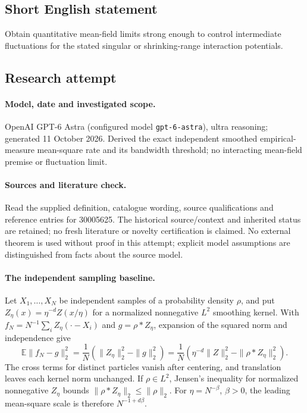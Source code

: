 \documentclass[11pt]{article}
\begin{document}
\subsection{Short English statement}
Obtain quantitative mean-field limits strong enough to control intermediate fluctuations for the stated singular or shrinking-range interaction potentials.
\subsection{Research attempt}
\paragraph{Model, date and investigated scope.}
OpenAI GPT-6 Astra (configured model \texttt{gpt-6-astra}), ultra reasoning; generated 11 October 2026. Derived the exact independent smoothed empirical-measure mean-square rate and its bandwidth threshold; no interacting mean-field premise or fluctuation limit.

\paragraph{Sources and literature check.}
Read the supplied definition, catalogue wording, source qualifications and reference entries for 30005625. The historical source/context and inherited status are retained; no fresh literature or novelty certification is claimed. No external theorem is used without proof in this attempt; explicit model assumptions are distinguished from facts about the source model.

\paragraph{The independent sampling baseline.} Let \(X_1,\ldots,X_N\) be independent samples of a probability density \(\rho\), and put \(Z_\eta(x)=\eta^{-d}Z(x/\eta)\) for a normalized nonnegative \(L^2\) smoothing kernel. With \(f_N=N^{-1}\sum_iZ_\eta(\cdot-X_i)\) and \(g=\rho*Z_\eta\), expansion of the squared norm and independence give
\[
 \mathbb E\|f_N-g\|_2^2
 =\frac1N\left(\|Z_\eta\|_2^2-\|g\|_2^2\right)
 =\frac1N\left(\eta^{-d}\|Z\|_2^2-\|\rho*Z_\eta\|_2^2\right).
\]
The cross terms for distinct particles vanish after centering, and translation leaves each kernel norm unchanged. If \(\rho\in L^2\), Jensen's inequality for normalized nonnegative \(Z_\eta\) bounds \(\|\rho*Z_\eta\|_2\le\|\rho\|_2\). For \(\eta=N^{-\beta}\), \(\beta>0\), the leading mean-square scale is therefore \(N^{-1+d\beta}\).
\end{document}

